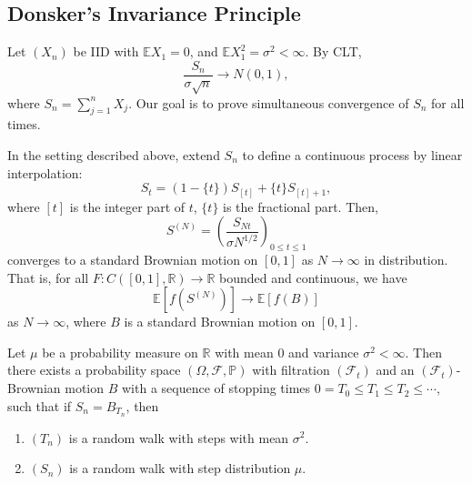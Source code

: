 \documentclass[12pt]{article}
\begin{document}

\subsection{Donsker's Invariance Principle}%
\label{sub:dip}

Let $(X_n)$ be IID with $\mathbb{E} X_1 = 0$, and $\mathbb{E} X_1^2 = \sigma^2 < \infty$. By CLT,
\[
\frac{S_n}{\sigma \sqrt n} \to N(0, 1),
\]
where $S_n = \sum_{j = 1}^n X_j$. Our goal is to prove simultaneous convergence of $S_n$ for all times.
\begin{theorem}
	In the setting described above, extend $S_n$ to define a continuous process by linear interpolation:
	\[
		S_t = (1 - \{t\})S_{[t]} + \{t\} S_{[t] + 1},
	\]
	where $[t]$ is the integer part of $t$, $\{t\}$ is the fractional part. Then,
	\[
	S^{(N)} = \left( \frac{S_{Nt}}{ \sigma N^{1/2}} \right)_{0 \leq t \leq 1}
	\]
	converges to a standard Brownian motion on $[0, 1]$ as $N \to \infty$ in distribution. That is, for all $F : C([0, 1], \mathbb{R}) \to \mathbb{R}$ bounded and continuous, we have
	\[
		\mathbb{E}[ f(S^{(N)})] \to \mathbb{E}[f(B)]
	\]
	as $N \to \infty$, where $B$ is a standard Brownian motion on $[0, 1]$.
\end{theorem}

\begin{theorem}
	Let $\mu$ be a probability measure on $\mathbb{R}$ with mean $0$ and variance $\sigma^2 < \infty$. Then there exists a probability space $(\Omega, \mathcal{F}, \mathbb{P})$ with filtration $(\mathcal{F}_t)$ and an $(\mathcal{F}_t)$-Brownian motion $B$ with a sequence of stopping times $0 = T_0 \leq T_1 \leq T_2 \leq \cdots$, such that if $S_n = B_{T_n}$, then
	\begin{enumerate}[\normalfont(i)]
		\item $(T_n)$ is a random walk with steps with mean $\sigma^2$.
		\item $(S_n)$ is a random walk with step distribution $\mu$.
	\end{enumerate}
\end{theorem}
\end{document}
